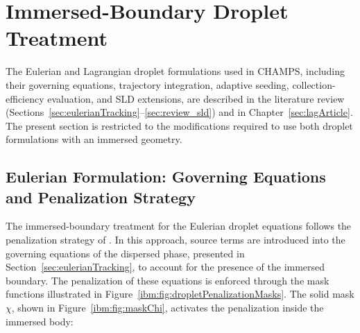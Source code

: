 \section{Immersed-Boundary Droplet Treatment}
\label{ibm:sec:dropSolver}

The Eulerian and Lagrangian droplet formulations used in \textsc{CHAMPS}, including their governing equations, trajectory integration, adaptive seeding, collection-efficiency evaluation, and SLD extensions, are described in the literature review (Sections~\ref{sec:eulerianTracking}--\ref{sec:review_sld}) and in Chapter~\ref{sec:lagArticle}. The present section is restricted to the modifications required to use both droplet formulations with an immersed geometry.

\subsection{Eulerian Formulation: Governing Equations and Penalization Strategy}
\label{ibm:sec:dropSolverEulerian}





The immersed-boundary treatment for the Eulerian droplet equations follows the penalization strategy of \cite{lavoieDroplets}. In this approach, source terms are introduced into the governing equations of the dispersed phase, presented in Section~\ref{sec:eulerianTracking}, to account for the presence of the immersed boundary. The penalization of these equations is enforced through the mask functions illustrated in Figure~\ref{ibm:fig:dropletPenalizationMasks}. The solid mask $\chi$, shown in Figure~\ref{ibm:fig:maskChi}, activates the penalization inside the immersed body:

